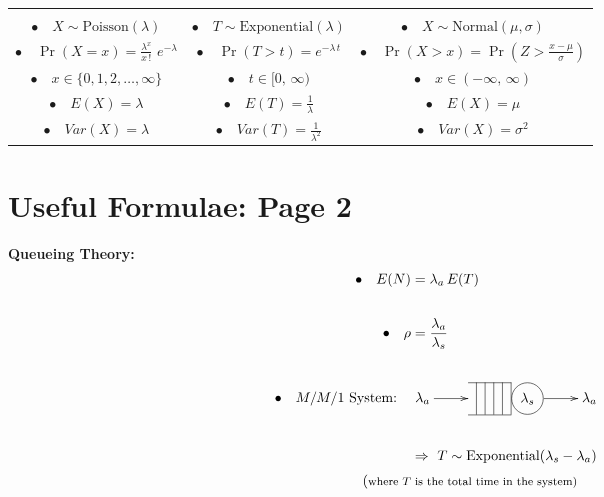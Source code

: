 \documentclass[12pt]{article}
\begin{document}
\begin{center}
\begin{tabular}{|c@{\qquad}|c@{\qquad}|c@{\qquad}|}
\hline
&&\\[-0.3cm]
$\bullet\quad X \sim \text{Poisson}(\lambda)$ & $\bullet\quad T \sim \text{Exponential}(\lambda)$ & $\bullet\quad X \sim \text{Normal}(\mu,\sigma)$ \\[0.6cm]
${\displaystyle\bullet\quad \Pr(X=x) = \frac{\lambda^x}{x\,!}\,\,e^{-\lambda}}$ & $\bullet\quad \Pr(T>t) = e^{-\lambda\,t}$ & ${\displaystyle\bullet\quad \Pr(X>x) = \Pr\left(Z > \frac{x-\mu}{\sigma}\right)}$\\[0.8cm]
$\bullet\quad x \in \{0,1,2,\ldots,\infty\}$ & $\bullet\quad t \in [0,\,\infty)$ & $\bullet\quad x \in (-\infty,\,\infty)$ \\[0.8cm]
$\bullet\quad E(X) = \lambda$ & ${\displaystyle\bullet\quad E(T) = \frac{1}{\lambda}}$ & $\bullet\quad E(X) = \mu$ \\[0.8cm]
$\bullet\quad Var(X) = \lambda$ & ${\displaystyle\bullet\quad Var(T) = \frac{1}{\lambda^2}}$ & $\bullet\quad Var(X) = \sigma^2$ \\[0.4cm]
\hline
\end{tabular}
\end{center}


\newpage

\section*{Useful Formulae: Page 2\\[0.3cm]}
{\bf Queueing Theory:}\\[-0.8cm]
\begin{align*}
\bullet\quad E(N) &= \lambda_a\,E(T)\\[0.6cm]
\bullet\quad \rho &= \frac{\lambda_a}{\lambda_s}\\[0.6cm]
\xymatrixcolsep{0.5cm}
\bullet\quad M/M/1 \text{ System:} \quad & \xymatrix{\lambda_a \ar@{->}[r] & \hspace{-0.1cm}
{\begin{tabular}{@{}c|@{}c|@{}c|@{}c|@{}c|@{}c}
\cline{1-5}
&&&& &
\begin{tikzpicture}[baseline=(char.base)]
\node(char)[draw,shape=circle]{$\lambda_s$};
\end{tikzpicture}\\
\cline{1-5}
\end{tabular}} \hspace{-0.3cm}\ar@{->}[r] &  \lambda_a} \\[0.6cm]
&\Rightarrow \,\, T \sim \text{Exponential}(\lambda_s-\lambda_a)\\[0.1cm]
{\footnotesize(\text{where $T$}} & {\footnotesize\text{ is the total time in the system)}}\\
\end{align*}
\end{document}
